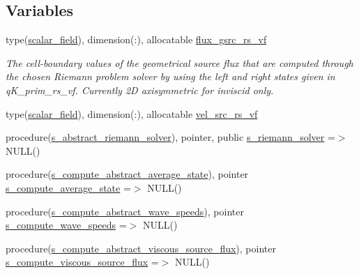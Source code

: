 \subsection*{Variables}
\begin{DoxyCompactItemize}
\item 
type(\hyperlink{structm__derived__types_1_1scalar__field}{scalar\+\_\+field}), dimension(\+:), allocatable \hyperlink{namespacem__riemann__solvers_aa67462b01acb62fbe8730a28aa37b7a9}{flux\+\_\+gsrc\+\_\+rs\+\_\+vf}
\begin{DoxyCompactList}\small\item\em The cell-\/boundary values of the geometrical source flux that are computed through the chosen Riemann problem solver by using the left and right states given in q\+K\+\_\+prim\+\_\+rs\+\_\+vf. Currently 2D axisymmetric for inviscid only. \end{DoxyCompactList}\item 
type(\hyperlink{structm__derived__types_1_1scalar__field}{scalar\+\_\+field}), dimension(\+:), allocatable \hyperlink{namespacem__riemann__solvers_aee9f1299db2c29eabb5d2ef096f0abe0}{vel\+\_\+src\+\_\+rs\+\_\+vf}
\item 
procedure(\hyperlink{interfacem__riemann__solvers_1_1s__abstract__riemann__solver}{s\+\_\+abstract\+\_\+riemann\+\_\+solver}), pointer, public \hyperlink{namespacem__riemann__solvers_a7edc50538c81447bf49e9242d85ee1ff}{s\+\_\+riemann\+\_\+solver} =$>$ N\+U\+LL()
\item 
procedure(\hyperlink{interfacem__riemann__solvers_1_1s__compute__abstract__average__state}{s\+\_\+compute\+\_\+abstract\+\_\+average\+\_\+state}), pointer \hyperlink{namespacem__riemann__solvers_a7bf84258c88a5e2c0accdc130ac812d9}{s\+\_\+compute\+\_\+average\+\_\+state} =$>$ N\+U\+LL()
\item 
procedure(\hyperlink{interfacem__riemann__solvers_1_1s__compute__abstract__wave__speeds}{s\+\_\+compute\+\_\+abstract\+\_\+wave\+\_\+speeds}), pointer \hyperlink{namespacem__riemann__solvers_a3e2b4d51fda04b61d6f54069c5bb66c6}{s\+\_\+compute\+\_\+wave\+\_\+speeds} =$>$ N\+U\+LL()
\item 
procedure(\hyperlink{interfacem__riemann__solvers_1_1s__compute__abstract__viscous__source__flux}{s\+\_\+compute\+\_\+abstract\+\_\+viscous\+\_\+source\+\_\+flux}), pointer \hyperlink{namespacem__riemann__solvers_a334d729c58a5c746cb0045d1f5f00b01}{s\+\_\+compute\+\_\+viscous\+\_\+source\+\_\+flux} =$>$ N\+U\+LL()
\end{DoxyCompactItemize}
\textbf{ }\par
